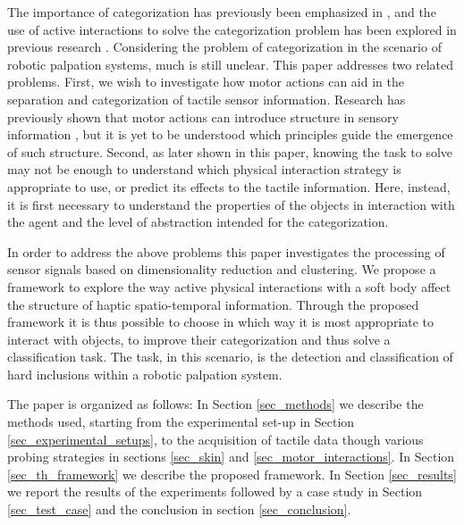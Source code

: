 The importance of categorization has previously been emphasized in \cite{hoffmann2012implications}, and the use of active 
interactions to solve the categorization problem has been explored in previous research 
\cite{pfeifer1997, nolfi2002active, tuci2009dynamics}.
Considering the problem of categorization in the scenario of robotic palpation systems, much is still unclear. 
\color{red}
This paper addresses two related problems. First, we wish to investigate how motor actions can aid in the separation and categorization of tactile sensor information. Research has previously shown that motor actions can introduce structure in sensory information \cite{lungarella2005methods, sporns2006evolving, pfeifer2007information}, but it is yet to be understood 
which principles guide the emergence of such structure. Second, as later shown in this paper, knowing the task to solve may not be enough to understand which physical interaction strategy is appropriate to use, or predict its effects to the tactile information. Here, instead, it is first necessary to understand the properties of the objects in interaction with the agent and the level of abstraction intended for the categorization.

\color{black}
In order to address the above problems this paper investigates the processing of sensor signals based on dimensionality 
reduction and clustering. We propose a framework to explore the way active physical interactions with a soft body affect the structure of haptic spatio-temporal information. Through the proposed framework it is thus possible to choose in which way it is most appropriate to interact with objects, to improve their categorization and thus solve a classification task. The task, in this scenario, is the detection and classification of hard inclusions within a robotic palpation system.

The paper is organized as follows: In Section \ref{sec_methods} we describe the methods used, starting from the experimental 
set-up in Section \ref{sec_experimental_setups}, to the acquisition of tactile data though various probing strategies in sections \ref{sec_skin} and \ref{sec_motor_interactions}. In Section \ref{sec_th_framework} we describe the proposed framework. In Section \ref{sec_results} we report the results of the experiments followed by a case study in Section \ref{sec_test_case} and the conclusion in section  \ref{sec_conclusion}. 



